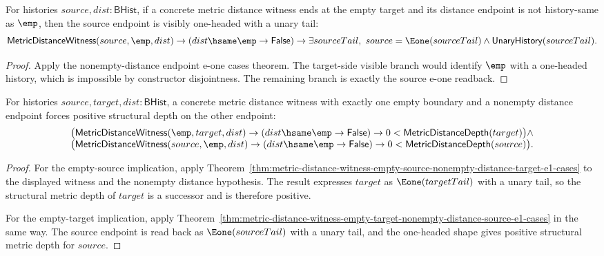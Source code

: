 \begin{theorem}
\label{thm:metric-distance-witness-empty-target-nonempty-distance-source-e1-cases}
For histories $source,dist:\mathsf{BHist}$, if a concrete metric distance
witness ends at the empty target and its distance endpoint is not history-same
as $\emp$, then the source endpoint is visibly one-headed with a unary tail:
$$
\mathsf{MetricDistanceWitness}(source,\emp,dist)\to
(dist\hsame\emp\to\mathsf{False})\to
\exists sourceTail,\ source=\Eone(sourceTail)\land
\mathsf{UnaryHistory}(sourceTail).
$$
\end{theorem}
\begin{proof}
Apply the nonempty-distance endpoint e-one cases theorem. The target-side
visible branch would identify $\emp$ with a one-headed history, which is
impossible by constructor disjointness. The remaining branch is exactly the
source e-one readback.
\end{proof}

\begin{theorem}
\label{thm:metric-distance-witness-empty-boundary-nonempty-distance-positive-endpoint-depth}
For histories $source,target,dist:\mathsf{BHist}$, a concrete metric distance
witness with exactly one empty boundary and a nonempty distance endpoint forces
positive structural depth on the other endpoint:
$$
\begin{array}{l}
\bigl(\mathsf{MetricDistanceWitness}(\emp,target,dist)\to
(dist\hsame\emp\to\mathsf{False})\to
0<\mathsf{MetricDistanceDepth}(target)\bigr)
\land\\
\bigl(\mathsf{MetricDistanceWitness}(source,\emp,dist)\to
(dist\hsame\emp\to\mathsf{False})\to
0<\mathsf{MetricDistanceDepth}(source)\bigr).
\end{array}
$$
\end{theorem}
\begin{proof}
For the empty-source implication, apply
Theorem~\ref{thm:metric-distance-witness-empty-source-nonempty-distance-target-e1-cases}
to the displayed witness and the nonempty distance hypothesis. The result
expresses $target$ as $\Eone(targetTail)$ with a unary tail, so the structural
metric depth of $target$ is a successor and is therefore positive.

For the empty-target implication, apply
Theorem~\ref{thm:metric-distance-witness-empty-target-nonempty-distance-source-e1-cases}
in the same way. The source endpoint is read back as $\Eone(sourceTail)$ with a
unary tail, and the one-headed shape gives positive structural metric depth for
$source$.
\end{proof}

